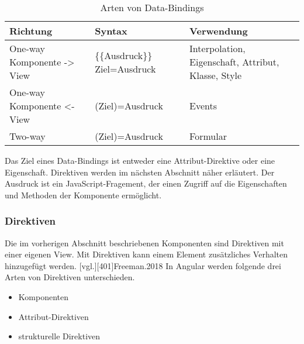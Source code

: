 \begin{table}
\begin{tabular}{|>{\raggedright\arraybackslash}p{3cm}|>{\raggedright\arraybackslash}p{3.2cm}|>{\raggedright\arraybackslash}p{7cm}|}
	\hline
	\textbf{Richtung}&\textbf{Syntax}&\textbf{Verwendung}\\
	\hline 
	One-way Komponente -> View &\{\{Ausdruck\}\} \lbrack Ziel\rbrack =\dq Ausdruck\dq  & Interpolation, Eigenschaft, Attribut, Klasse, Style\\ 
	\hline 
	One-way Komponente <- View &(Ziel)=\dq Ausdruck\dq&Events\\ 
	\hline 
	Two-way&\lbrack (Ziel)\rbrack =\dq Ausdruck\dq&Formular\\ 
	\hline 
\end{tabular}
\caption{Arten von Data-Bindings}
\label{tab:DataBinding}
\end{table}

Das Ziel eines Data-Bindings ist entweder eine Attribut-Direktive oder eine Eigenschaft. Direktiven werden im nächsten Abschnitt näher erläutert. Der Ausdruck ist ein JavaScript-Fragement, der einen Zugriff auf die Eigenschaften und Methoden der Komponente ermöglicht. \autocites[vgl.][237\psqq]{Freeman.2018}[vgl.][52\psq]{Steyer.2017} [vgl.][]{Google.d} 





\subsubsection{Direktiven}



Die im vorherigen Abschnitt beschriebenen Komponenten sind Direktiven mit einer eigenen View. Mit Direktiven kann einem Element zusätzliches Verhalten hinzugefügt werden. \autocite[vgl.][265]{Steyer.2017}[vgl.][401]{Freeman.2018} In Angular werden folgende drei Arten von Direktiven unterschieden. \autocite[vgl.]{Google.}

\begin{itemize}
	\item Komponenten
	\item Attribut-Direktiven
	\item strukturelle Direktiven 
\end{itemize}

